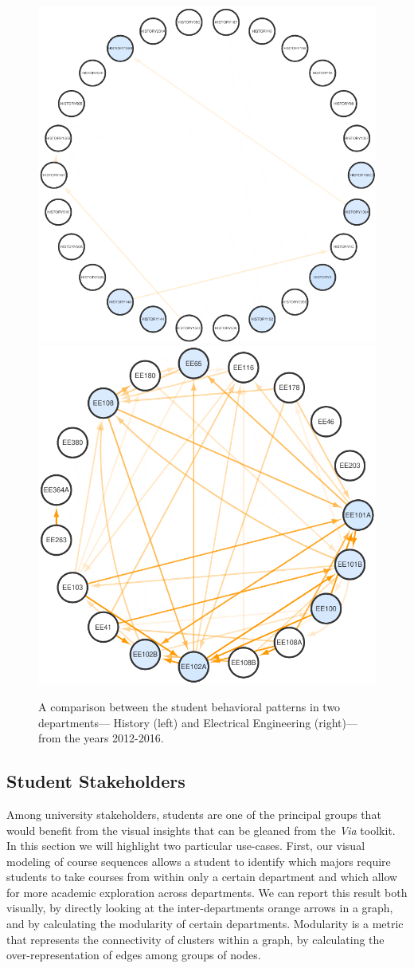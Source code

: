 \documentclass{sigchi}
\begin{document}
\begin{figure}
    \centering
    \includegraphics[width=0.55\columnwidth]{final-modularity-history.pdf}
    \includegraphics[width=0.44\columnwidth]{final-modularity-ee.pdf}
    \caption{A comparison between the student behavioral patterns in two departments--- History (left) and Electrical Engineering (right)--- from the years 2012-2016.}
    \label{fig:modularity}
\end{figure}

\subsection{Student Stakeholders}
\label{sec:student_stakeholders}
Among university stakeholders, students are one of the principal groups that would benefit from the visual insights that can be gleaned from the \textit{Via} toolkit. In this section we will highlight two particular use-cases. First, our visual modeling of course sequences allows a student to identify which majors require students to take courses from within only a certain department and which allow for more academic exploration across departments. We can report this result both visually, by directly looking at the inter-departments orange arrows in a graph, and by calculating the modularity of certain departments. Modularity is a metric that represents the connectivity of clusters within a graph, by calculating the over-representation of edges among groups of nodes.
\end{document}
